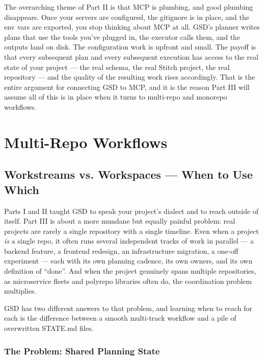 \documentclass[11pt,letterpaper,openany]{book}
\begin{document}
The overarching theme of Part II is that MCP is plumbing, and good
plumbing disappears. Once your servers are configured, the
gitignore is in place, and the env vars are exported, you stop
thinking about MCP at all. GSD's planner writes plans that use the
tools you've plugged in, the executor calls them, and the outputs
land on disk. The configuration work is upfront and small. The
payoff is that every subsequent plan and every subsequent execution
has access to the real state of your project --- the real schema,
the real Stitch project, the real repository --- and the quality of
the resulting work rises accordingly. That is the entire argument
for connecting GSD to MCP, and it is the reason Part III will
assume all of this is in place when it turns to multi-repo and
monorepo workflows.

\part{Multi-Repo Workflows}

\chapter{Workstreams vs. Workspaces --- When to Use Which}

Parts I and II taught GSD to speak your project's dialect and to reach
outside of itself. Part III is about a more mundane but equally painful
problem: real projects are rarely a single repository with a single
timeline. Even when a project \emph{is} a single repo, it often runs
several independent tracks of work in parallel --- a backend feature,
a frontend redesign, an infrastructure migration, a one-off experiment
--- each with its own planning cadence, its own owners, and its own
definition of ``done''. And when the project genuinely spans multiple
repositories, as microservice fleets and polyrepo libraries often do,
the coordination problem multiplies.

GSD has two different answers to that problem, and learning when to
reach for each is the difference between a smooth multi-track workflow
and a pile of overwritten STATE.md files.

\section{The Problem: Shared Planning State}
\end{document}
